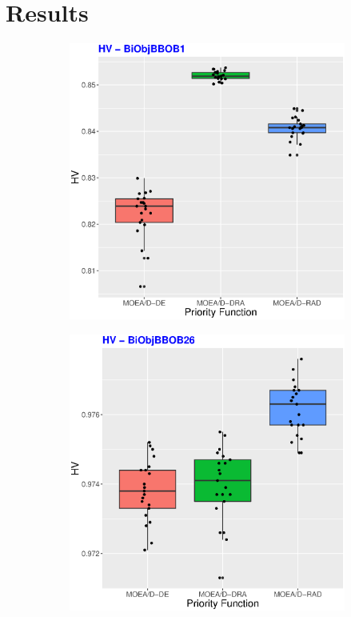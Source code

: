\section{Results}

\begin{figure}[!t]
	\centering
	\begin{subfigure}[b]{0.33\textwidth}
		\centering
		\includegraphics[width=1\textwidth, height=1\textwidth]{img/BiObjBBOB1_HV.eps}
	\end{subfigure}
	\begin{subfigure}[b]{0.33\textwidth}
		\centering
		\includegraphics[width=1\textwidth, height=1\textwidth]{img/BiObjBBOB26_HV.eps}

\end{subfigure}
\end{figure}
